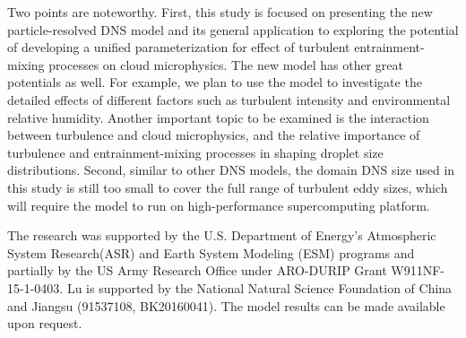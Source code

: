 \documentclass[draft,linenumbers]{AGUJournal}
\begin{document}
Two points are noteworthy. First, this study is focused on presenting the new particle-resolved DNS model and its general application to exploring the potential of developing a unified parameterization for effect of turbulent entrainment-mixing processes on cloud microphysics. The new model has other great potentials as well. For example, we plan to use the model to investigate the detailed effects of different factors such as turbulent intensity and environmental relative humidity. Another important topic to be examined is the interaction between turbulence and cloud microphysics, and the relative importance of turbulence and entrainment-mixing processes in shaping droplet size distributions. Second, similar to other DNS models, the domain DNS size used in this study is still too small to cover the full range of turbulent eddy sizes, which will require the model to run on high-performance supercomputing platform.  

\acknowledgments
The research was supported by the U.S. Department of Energy's Atmospheric System Research(ASR) and Earth System Modeling (ESM) programs and partially by the US Army Research Office under ARO-DURIP Grant W911NF-15-1-0403. Lu is supported by the National Natural Science Foundation of China and Jiangsu (91537108, BK20160041). The model results can be made available upon request.
\end{document}
